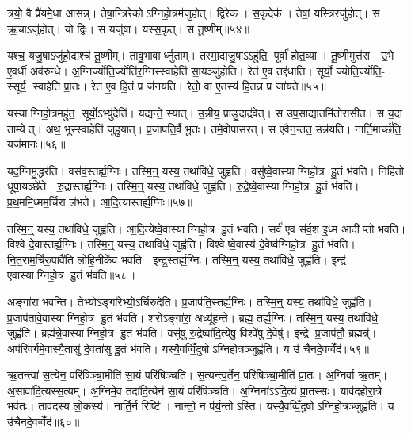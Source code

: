 त्रयो॒ वै प्रै॑यमे॒धा आ॑सन्न्। तेषा॒न्त्रिरेकोऽग्निहो॒त्रम॑जुहोत्। द्विरेक॑। स॒कृदेक॑। तेषां॒ यस्त्रिरजु॑होत्। स ऋ॒चाऽजु॑होत्। यो द्विः। स यजु॑षा। यस्स॒कृत्। स तू॒ष्णीम्॥५४॥

यश्च॒ यजु॒षाऽजु॑हो॒द्यश्च॑ तू॒ष्णीम्। तावु॒भावार्ध्नुताम्। तस्मा॒द्यजु॒षाऽऽहु॑ति॒ पूर्वा॑ होत॒व्या। तू॒ष्णीमुत्त॑रा। उ॒भे ए॒वर्धी अव॑रुन्धे। अ॒ग्निर्ज्योति॒र्ज्योति॑र॒ग्निस्स्वाहेति॑ सा॒यञ्जु॑होति। रेत॑ ए॒व तद्द॑धाति। सूर्यो॒ ज्योति॒र्ज्योति॒- स्सूर्य॒ स्वाहेति॑ प्रा॒तः। रेत॑ ए॒व हि॒तं प्र ज॑नयति। रेतो॒ वा ए॒तस्य॑ हि॒तन्न प्र जा॑यते॥५५॥

यस्याग्निहो॒त्रमहु॑त॒ सूर्यो॒ऽभ्यु॑देति॑। यद्यन्ते॒ स्यात्। उ॒न्नीय॒ प्राङु॒दाद्र॑वेत्। स उ॑प॒साद्यातमि॑तोरासीत। स य॒दा ताम्येत्। अथ॒ भूस्स्वाहेति॑ जुहुयात्। प्र॒जाप॑ति॒र्वै भू॒तः। तमे॒वोपा॑सरत्। स ए॒वैन॒न्तत॒ उन्न॑यति। नार्ति॒मार्च्छ॑ति॒ यज॑मानः॥५६॥\anuvakamend[तू॒ष्णीञ्जा॑यते॒ यज॑मानः]

यद॒ग्निमु॒द्धर॑ति। वस॑व॒स्तर्ह्य॒ग्निः। तस्मि॒न्॒ यस्य॒ तथा॑विधे॒ जुह्व॑ति। वसु॑ष्वे॒वास्याग्निहो॒त्र हु॒तं भ॑वति। निहि॑तो धूपा॒यञ्छे॑ते। रु॒द्रास्तर्ह्य॒ग्निः। तस्मि॒न्॒ यस्य॒ तथा॑विधे॒ जुह्व॑ति। रु॒द्रे॒ष्वे॒वास्याग्निहो॒त्र हु॒तं भ॑वति। प्र॒थ॒ममि॒ध्मम॒र्चिरा ल॑भते। आ॒दि॒त्यास्तर्ह्य॒ग्निः॥५७॥

तस्मि॒न्॒ यस्य॒ तथा॑विधे॒ जुह्व॑ति। आ॒दि॒त्येष्वे॒वास्याग्निहो॒त्र हु॒तं भ॑वति। सर्व॑ ए॒व स॑र्व॒श इ॒ध्म आदीप्तो भवति। विश्वे॑ दे॒वास्तर्ह्य॒ग्निः। तस्मि॒न्॒ यस्य॒ तथा॑विधे॒ जुह्व॑ति। विश्वेष्वे॒वास्य॑ दे॒वेष्व॑ग्निहो॒त्र हु॒तं भ॑वति। नि॒त॒राम॒र्चिरु॒पावै॑ति लोहि॒नीके॑व भवति। इन्द्र॒स्तर्ह्य॒ग्निः। तस्मि॒न्॒ यस्य॒ तथा॑विधे॒ जुह्व॑ति। इन्द्र॑ ए॒वास्याग्निहो॒त्र हु॒तं भ॑वति॥५८॥

अङ्गा॑रा भवन्ति। तेभ्योऽङ्गा॑रेभ्यो॒ऽर्चिरुदे॑ति। प्र॒जाप॑ति॒स्तर्ह्य॒ग्निः। तस्मि॒न्॒ यस्य॒ तथा॑विधे॒ जुह्व॑ति। प्र॒जाप॑तावे॒वास्याग्निहो॒त्र हु॒तं भ॑वति। शरोऽङ्गा॑रा॒ अध्यू॑हन्ते। ब्रह्म॒ तर्ह्य॒ग्निः। तस्मि॒न्॒ यस्य॒ तथा॑विधे॒ जुह्व॑ति। ब्रह्म॑न्ने॒वास्याग्निहो॒त्र हु॒तं भ॑वति। वसु॑षु रु॒द्रेष्वा॑दि॒त्येषु॒ विश्वे॑षु दे॒वेषु॑। इन्द्रे प्र॒जाप॑तौ॒ ब्रह्मन्न्॑। अप॑रिवर्गमे॒वास्यै॒तासु॑ दे॒वता॑सु हु॒तं भ॑वति। यस्यै॒वव्विँ॒दुषोऽग्निहो॒त्रञ्जुह्व॑ति। य उ॑ चैनदे॒वव्वेँद॑॥५९॥\anuvakamend[आ॒दि॒त्यास्तर्ह्य॒ग्निरिन्द्र॑ ए॒वास्याग्निहो॒त्र हु॒तं भ॑वति दे॒वेषु॑ च॒त्वारि॑ च (यद॒ग्निन्निहि॑तः प्रथ॒म सर्व॑ ए॒व नि॑त॒रामङ्गा॑रा॒श्शरोऽङ्गा॑रा॒ ब्रह्म॒ वसु॑ष्व॒ष्टौ ॥ )]

ऋ॒तन्त्वा॑ स॒त्येन॒ परि॑षिञ्चा॒मीति॑ सा॒यं परि॑षिञ्चति। स॒त्यन्त्व॒र्तेन॒ परि॑षिञ्चा॒मीति॑ प्रा॒तः। अ॒ग्निर्वा ऋ॒तम्। अ॒सावा॑दि॒त्यस्स॒त्यम्। अ॒ग्निमे॒व तदा॑दि॒त्येन॑ सा॒यं परि॑षिञ्चति। अ॒ग्निना॑ऽऽदि॒त्यं प्रा॒तस्सः। याव॑दहोरा॒त्रे भव॑तः। ताव॑दस्य लो॒कस्य॑। नार्ति॒र्न रिष्टि॑। नान्तो॒ न प॑र्य॒न्तोऽस्ति। यस्यै॒वव्विँ॒दुषोऽग्निहो॒त्रञ्जुह्व॑ति। य उ॑चैनदे॒वव्वेँद॑॥६०॥

